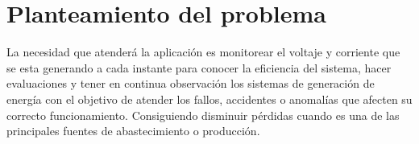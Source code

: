 
\section{Planteamiento del problema}

La necesidad que atenderá la aplicación es monitorear el voltaje y corriente que se esta generando a cada instante para conocer la eficiencia del sistema, hacer evaluaciones y tener en continua observación los sistemas de generación de energía con el objetivo de atender los fallos, accidentes o anomalías que afecten su correcto funcionamiento. Consiguiendo disminuir pérdidas cuando es una de las principales fuentes de abastecimiento o producción.
